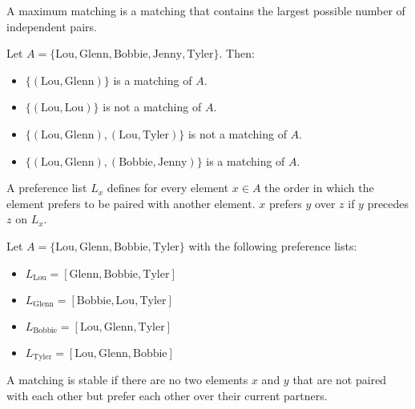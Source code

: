 \begin{definition}
    A maximum matching is a matching that contains the largest possible number of independent pairs.
\end{definition}

\begin{eg}
    Let $A = \{\text{Lou}, \text{Glenn}, \text{Bobbie}, \text{Jenny}, \text{Tyler}\}$. Then:
    \begin{itemize}[itemsep=1pt,label=$\circ$]
        \item $\{(\text{Lou}, \text{Glenn})\}$ is a matching of $A$.
        \item $\{(\text{Lou}, \text{Lou})\}$ is not a matching of $A$.
        \item $\{(\text{Lou}, \text{Glenn}), (\text{Lou}, \text{Tyler})\}$ is not a matching of $A$.
        \item $\{(\text{Lou}, \text{Glenn}), (\text{Bobbie}, \text{Jenny})\}$ is a matching of $A$.
    \end{itemize}
\end{eg}

\begin{definition}
    A preference list $L_x$ defines for every element $x \in A$ the order in which the element prefers to be paired with another element. $x$ prefers $y$ over $z$ if $y$ precedes $z$ on $L_x$.
\end{definition}
\begin{eg}
    Let $A = \{\text{Lou}, \text{Glenn}, \text{Bobbie}, \text{Tyler}\}$ with the following preference lists:
    \begin{itemize}[itemsep=1pt,label=$\circ$]
        \item $L_{\text{Lou}} = [\text{Glenn}, \text{Bobbie}, \text{Tyler}]$
        \item $L_{\text{Glenn}} = [\text{Bobbie}, \text{Lou}, \text{Tyler}]$
        \item $L_{\text{Bobbie}} = [\text{Lou}, \text{Glenn}, \text{Tyler}]$
        \item $L_{\text{Tyler}} = [\text{Lou}, \text{Glenn}, \text{Bobbie}]$
    \end{itemize}
\end{eg}

\begin{definition}
    A matching is stable if there are no two elements $x$ and $y$ that are not paired with each other but prefer each other over their current partners.
\end{definition}

